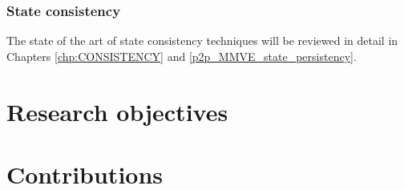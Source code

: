 \subsubsection{State consistency}

The state of the art of state consistency techniques will be reviewed in detail in Chapters \ref{chp:CONSISTENCY} and \ref{p2p_MMVE_state_persistency}.

\section{Research objectives}

\section{Contributions}
\label{objectives}

